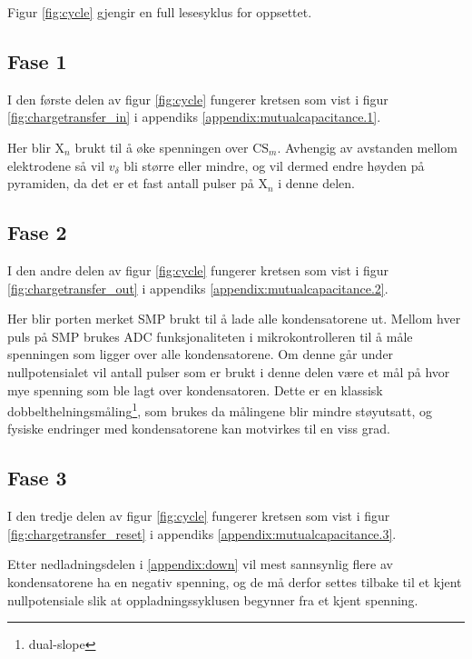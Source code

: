 Figur \vref{fig:cycle} gjengir en full lesesyklus for oppsettet. 

\subsection{Fase 1}
I den første delen av figur \vref{fig:cycle} fungerer kretsen som vist i figur \vref{fig:chargetransfer_in} i appendiks \vref{appendix:mutualcapacitance.1}.

Her blir \(\text{X}_n\) brukt til å øke spenningen over \(\text{CS}_m\). Avhengig av avstanden mellom elektrodene så vil \(v_\delta\) bli større eller mindre, og 
vil dermed endre høyden på pyramiden, da det er et fast antall pulser på \(\text{X}_n\) i denne delen.

\subsection{Fase 2}\label{appendix:down}
I den andre delen av figur \vref{fig:cycle} fungerer kretsen som vist i figur \vref{fig:chargetransfer_out} i appendiks \vref{appendix:mutualcapacitance.2}. 

Her blir porten merket SMP  brukt til å lade alle kondensatorene ut. Mellom hver puls på SMP brukes ADC funksjonaliteten i mikrokontrolleren til å 
måle spenningen som ligger over alle kondensatorene. Om denne går under nullpotensialet vil antall pulser som er brukt i denne delen være et mål 
på hvor mye spenning som ble lagt over kondensatoren. Dette er en klassisk dobbelthelningsmåling\footnote{dual-slope}, som brukes da målingene blir mindre støyutsatt, og 
fysiske endringer med kondensatorene kan motvirkes til en viss grad.

\subsection{Fase 3}
I den tredje delen av figur \vref{fig:cycle} fungerer kretsen som vist i figur \vref{fig:chargetransfer_reset} i appendiks \vref{appendix:mutualcapacitance.3}.

Etter nedladningsdelen i \vref{appendix:down} vil mest sannsynlig flere av kondensatorene ha en negativ spenning, og de må derfor settes tilbake 
til et kjent nullpotensiale slik at oppladningssyklusen begynner fra et kjent spenning.
